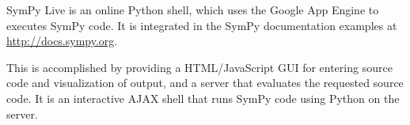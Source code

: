 SymPy Live is an online Python shell, which uses the Google
App Engine to executes SymPy code. It is integrated in the SymPy
documentation examples at \href{http://docs.sympy.org}{http://docs.sympy.org}.

This is accomplished by providing a HTML/JavaScript GUI for entering
source code and visualization of output, and a server that
evaluates the requested source code. It is an interactive AJAX shell
that runs SymPy code using Python on the server.
